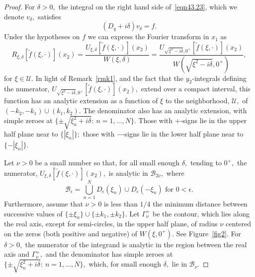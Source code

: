 \documentclass[11pt]{article}
\newcommand\cU{\mathcal U}
\newcommand\cB{\mathcal B}
\newcommand\tf{\tilde{f}}
\theoremstyle{definition}
\theoremstyle{remark}
\begin{document}
\begin{proof}
  For $\delta>0,$ the integral on the right hand side
  of~\eqref{eqn43.23}, which we denote $v_{\delta},$ satisfies
  \begin{equation}\label{eqn75.51}
    (D_q+i\delta)v_{\delta}=f.
  \end{equation}
Under the hypotheses on $f$  we can express the Fourier transform in
$x_1$ as
\begin{equation}
  R_{\xi,\delta}[\tf(\xi,\cdot)](x_2)=
  \frac{U_{\xi,\delta}[\tf(\xi,\cdot)](x_2)}
{W(\xi,\delta)}=
\frac{U_{\sqrt{\xi^2-i\delta},0^+}[\tf(\xi,\cdot)](x_2)}
{W(\sqrt{\xi^2-i\delta},0^+)},
\end{equation}
for $\xi\in\cU.$ In light of Remark~\ref{rmk1}, and the fact that the
$y_2$-integrals defining the numerator, $U_{\sqrt{\xi^2-i\delta},0^+}[\tf(\xi,\cdot)](x_2),$
extend over a compact interval, this function has an analytic extension as a
function of $\xi$ to the neighborhood, $\cU,$ of $(-k_2,-k_1)\cup (k_1,k_2).$
The denominator also has an analytic extension, with simple zeroes at
$\{\pm\sqrt{\xi^2_n+i\delta}:\:n=1,\dots,N\}.$ Those with $+$-signs lie in the
upper half plane near to $\{|\xi_n|\};$ those with $-$-signs lie in the lower
half plane near to $\{-|\xi_n|\}.$

Let $\nu>0$ be a small number so that, for all small enough $\delta,$
tending to $0^+,$ the numerator,
$U_{\xi,\delta}[\tf(\xi,\cdot)](x_2),$ is analytic in $ \cB_{2\nu},$ where
\begin{equation}
 \cB_{\epsilon}= \bigcup_{n=1}^ND_{\epsilon}(\xi_n)\cup
 D_{\epsilon}(-\xi_n)\text{ for }0<\epsilon.
\end{equation}
Furthermore, assume that $\nu>0$ is less than $1/4$ the minimum
distance between successive values of $\{\pm\xi_n\}\cup\{\pm k_1,\pm
k_2\}.$ Let $\Gamma^+_{\nu}$ be the contour, which lies along the real
axis, except for semi-circles, in the upper half plane, of radius
$\nu$ centered on the zeros (both positive and negative) of
$W(\xi,0^+).$ See Figure~\ref{fig2}.  For $\delta>0,$ the numerator of
the integrand is analytic in the region between the real axis and
$\Gamma^+_{\nu},$ and the denominator has simple zeroes at
$\{\pm\sqrt{\xi^2_n+i\delta}:\:n=1,\dots,N\},$ which, for small enough
$\delta,$ lie in $\cB_{\nu}.$


\end{proof}
\end{document}
